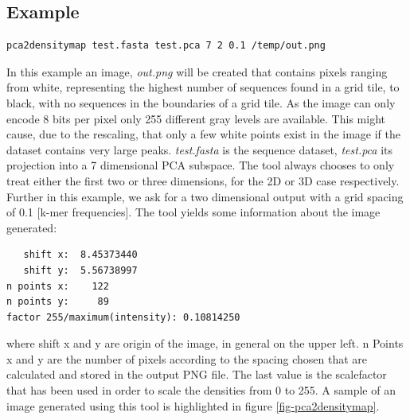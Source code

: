 \subsection{Example}
\begin{lstlisting}
pca2densitymap test.fasta test.pca 7 2 0.1 /temp/out.png
\end{lstlisting}
In this example an image, \emph{out.png} will be created that contains
pixels ranging from
white, representing the highest number of sequences found in a  grid
tile, to black, with no sequences in the boundaries of a grid
tile. As the image can only encode 8 bits per pixel only 255 different
gray levels are available. This might cause, due to the rescaling,
that only a few white points exist in the image if the dataset
contains very large peaks. \emph{test.fasta} is the sequence
dataset, \emph{test.pca} its projection into a 7 dimensional PCA
subspace. The tool always chooses to only treat either the first two or
three dimensions, for the 2D or 3D case respectively.
Further in this example, we ask for a two dimensional output
with a grid spacing of
0.1 [k-mer frequencies]. The tool yields some information about
the image generated:
\begin{lstlisting}
   shift x:  8.45373440
   shift y:  5.56738997
n points x:    122
n points y:     89
factor 255/maximum(intensity): 0.10814250
\end{lstlisting}
where shift x and y are origin of the image, in general on the upper
left. n Points x and y are the number of pixels according to the
spacing chosen that are calculated and stored in the output PNG
file. The last value is the scalefactor that has been used in order to
scale the densities from 0 to 255. A sample
of an image generated using this tool is highlighted in figure
\ref{fig-pca2densitymap}.

